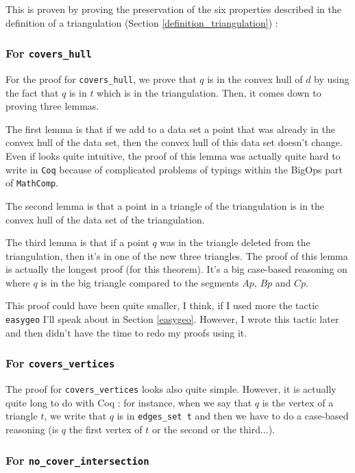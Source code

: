 \documentclass[a4paper,10pt]{article}
\begin{document}
This is proven by proving the preservation of the six properties described in the definition of a triangulation (Section \ref{definition_triangulation}) :
\subsubsection{For {\tt covers\_hull}}
\label{cvh1}
 For the proof for {\tt covers\_hull}, we prove that $q$ is in the convex hull of $d$ by using the fact that $q$ is in $t$ which is in the triangulation. Then, it comes down to proving three lemmas.

  The first lemma is that if we add to a data set a point that was already in the convex hull of the data set, then the convex hull of this data set doesn't change. Even if looks quite intuitive, the proof of this lemma was actually quite hard to write in {\tt Coq} because of complicated problems of typings within the BigOps part of {\tt MathComp}. 
  
  The second lemma is that a point in a triangle of the triangulation is in the convex hull of the data set of the triangulation.

  The third lemma is that if a point $q$ was in the triangle deleted from the triangulation, then it's in one of the new three triangles. The proof of this lemma is actually the longest proof (for this theorem).
  It's a big case-based reasoning on where $q$ is in the big triangle compared to the segments $Ap$, $Bp$ and $Cp$.
  
  This proof could have been quite smaller, I think, if I used more the tactic {\tt easygeo} I'll speak about in Section \ref{easygeo}. However, I wrote this tactic later and then didn't have the time to redo my proofs using it.

  \subsubsection{For {\tt covers\_vertices}}
  \label{cvv1}
  
  The proof for {\tt covers\_vertices} looks also quite simple. However, it is actually quite long to do with Coq : for instance, when we say that $q$ is the vertex of a triangle $t$, we write that $q$ is in {\tt edges\_set t} and then we have to do a case-based reasoning (is $q$ the first vertex of $t$ or the second or the third...).

  \subsubsection{For {\tt no\_cover\_intersection}}
\end{document}
